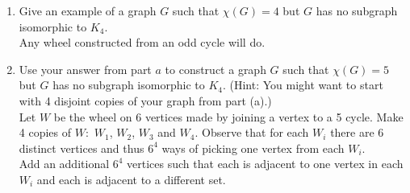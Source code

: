 \documentclass[11pt]{article}
\begin{document}
\begin{enumerate}
	\item Give an example of a graph $G$ such that $\chi(G)=4$ but $G$ has no subgraph isomorphic to $K_4.$\\
	
	Any wheel constructed from an odd cycle will do.
	\item Use your answer from part $a$ to construct a graph $G$ such that $\chi(G)=5$ but $G$ has no subgraph isomorphic to $K_4.$ (Hint: You might want to start with 4 disjoint copies of your graph from part (a).)\\
	
	Let $W$ be the wheel on 6 vertices made by joining a vertex to a 5 cycle. Make 4 copies of $W:$ $W_1$, $W_2$, $W_3$ and $W_4$. Observe that for each $W_i$ there are 6 distinct vertices and thus $6^4$ ways of picking one vertex from each $W_i.$ \\
	
Add an additional $6^4$ vertices such that each is adjacent to one vertex in each $W_i$ and each is adjacent to a different set. \\
	
\end{enumerate}
\vfill
\end{document}
